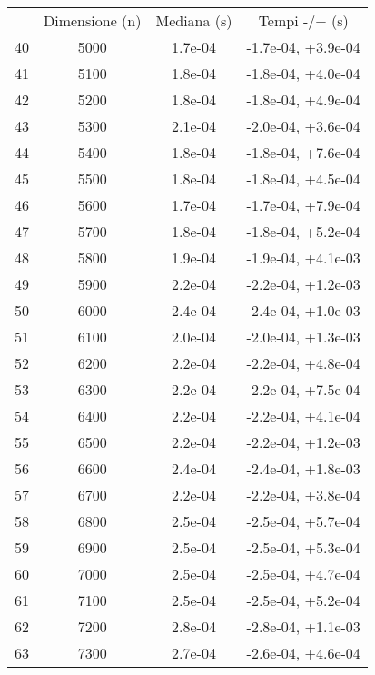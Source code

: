 \begin{table}
\centering
\begin{adjustbox}{width=1\textwidth/2}
\begin{tabular}{|c|c|c|c|}
\hline
 & Dimensione (n) & Mediana (s) & Tempi -/+ (s) \\
40 & 5000 & 1.7e-04 & -1.7e-04, +3.9e-04 \\
\cline{1-4}
41 & 5100 & 1.8e-04 & -1.8e-04, +4.0e-04 \\
\cline{1-4}
42 & 5200 & 1.8e-04 & -1.8e-04, +4.9e-04 \\
\cline{1-4}
43 & 5300 & 2.1e-04 & -2.0e-04, +3.6e-04 \\
\cline{1-4}
44 & 5400 & 1.8e-04 & -1.8e-04, +7.6e-04 \\
\cline{1-4}
45 & 5500 & 1.8e-04 & -1.8e-04, +4.5e-04 \\
\cline{1-4}
46 & 5600 & 1.7e-04 & -1.7e-04, +7.9e-04 \\
\cline{1-4}
47 & 5700 & 1.8e-04 & -1.8e-04, +5.2e-04 \\
\cline{1-4}
48 & 5800 & 1.9e-04 & -1.9e-04, +4.1e-03 \\
\cline{1-4}
49 & 5900 & 2.2e-04 & -2.2e-04, +1.2e-03 \\
\cline{1-4}
50 & 6000 & 2.4e-04 & -2.4e-04, +1.0e-03 \\
\cline{1-4}
51 & 6100 & 2.0e-04 & -2.0e-04, +1.3e-03 \\
\cline{1-4}
52 & 6200 & 2.2e-04 & -2.2e-04, +4.8e-04 \\
\cline{1-4}
53 & 6300 & 2.2e-04 & -2.2e-04, +7.5e-04 \\
\cline{1-4}
54 & 6400 & 2.2e-04 & -2.2e-04, +4.1e-04 \\
\cline{1-4}
55 & 6500 & 2.2e-04 & -2.2e-04, +1.2e-03 \\
\cline{1-4}
56 & 6600 & 2.4e-04 & -2.4e-04, +1.8e-03 \\
\cline{1-4}
57 & 6700 & 2.2e-04 & -2.2e-04, +3.8e-04 \\
\cline{1-4}
58 & 6800 & 2.5e-04 & -2.5e-04, +5.7e-04 \\
\cline{1-4}
59 & 6900 & 2.5e-04 & -2.5e-04, +5.3e-04 \\
\cline{1-4}
60 & 7000 & 2.5e-04 & -2.5e-04, +4.7e-04 \\
\cline{1-4}
61 & 7100 & 2.5e-04 & -2.5e-04, +5.2e-04 \\
\cline{1-4}
62 & 7200 & 2.8e-04 & -2.8e-04, +1.1e-03 \\
\cline{1-4}
63 & 7300 & 2.7e-04 & -2.6e-04, +4.6e-04 \\

\end{tabular}
\end{adjustbox}
\end{table}
